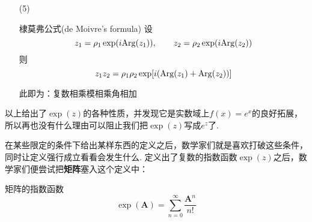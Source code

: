 \documentclass[main.tex]{subfiles}
\begin{document}
\begin{itemize}
    \textit{
        证明：代入欧拉公式即可，需要用到如下两个三角恒等式：
        \[\sin(\arctan(x))=\frac{x}{\sqrt{1+x^2}},\qquad \cos(\arctan(x))=\frac{1}{\sqrt{1+x^2}}\]
    }
    \begin{align*}
        \sqrt{a^2+b^2}\exp\left(i\arctan\frac{b}{a}\right) &= 
        \sqrt{a^2+b^2}\left[\cos\left(\arctan\frac{b}{a}\right)+i\sin\left(\arctan\frac{b}{a}\right)\right] \\
        &=\sqrt{a^2+b^2}\left[\frac{a}{\sqrt{a^2+b^2}}+\frac{ib}{\sqrt{a^2+b^2}}\right] = a+ib
    \end{align*}
    \textit{
        由于\(|\exp(ix)|\equiv 1\)，所以只要限定\(a^2+b^2\)为常数，那么复数\(a+ib\)取值的集合就是一个圆心在原点、半径为\(\rho=|a+ib|\)的圆，此时可以将复平面转化为极坐标系，复数（相当于向量）就可以由极径和极角来确定，因此可以做出以下定义。
    }
    \begin{definition}{复数的指数形式}
        令\(z=a+ib\)，则\(z=\rho\exp(i{\rm Arg}(z))\)，其中\(\rho=\sqrt{a^2+b^2}\)是复数的\uline{模}(modulo)；\({\rm Arg}(z)\)称为复数的\uline{辐角}(argument)，其定义为 
        \[{\rm Arg}(z) = \left\{
        \begin{aligned}  
            & \frac{\pi}{2} + 2k\pi, & a =0, b > 0 \\ 
            & -\frac{\pi}{2} + 2k\pi, & a = 0, b < 0  \\ 
            & \arctan\frac{b}{a}+2k\pi, & a \neq 0
        \end{aligned}
        \right. \qquad \mbox{其中} k \in \mathbb{Z} 
        \]
        \({\rm Arg}(z)\)在\([-\pi,\pi)\)上的值称为辐角主值，写作\({\rm arg}(z)\).
    \end{definition}
    尽管\({\rm Arg}(z)\)是分段定义的，但它其实是连续函数.
    \item[(5)]
    \begin{theorem}{棣莫弗公式(de Moivre's formula)}
        设
        \[z_1=\rho_1\exp(i{\rm Arg}(z_1)), \qquad z_2=\rho_2\exp(i{\rm Arg}(z_2))\]
        则
        \[z_1z_2=\rho_1\rho_2\exp[i({\rm Arg}(z_1)+{\rm Arg}(z_2))]\]
    \end{theorem}
    此即为：复数相乘模相乘角相加
\end{itemize}

以上给出了\(\exp(z)\)的各种性质，并发现它是实数域上\(f(x)=e^x\)的良好拓展，所以再也没有什么理由可以阻止我们把\(\exp(z)\)写成\(e^z\)了.

\vspace{1cm}

在某些限定的条件下给出某样东西的定义之后，数学家们就是喜欢打破这些条件，同时让定义强行成立看看会发生什么. 定义出了复数的指数函数\(\exp(z)\)之后，数学家们便尝试把\textbf{矩阵}塞入这个定义中：
\begin{definition}{矩阵的指数函数}
    \[\exp({\bm A}) = \sum_{n=0}^{\infty}\frac{{\bm A}^n}{n!}\]
\end{definition}
\end{document}
